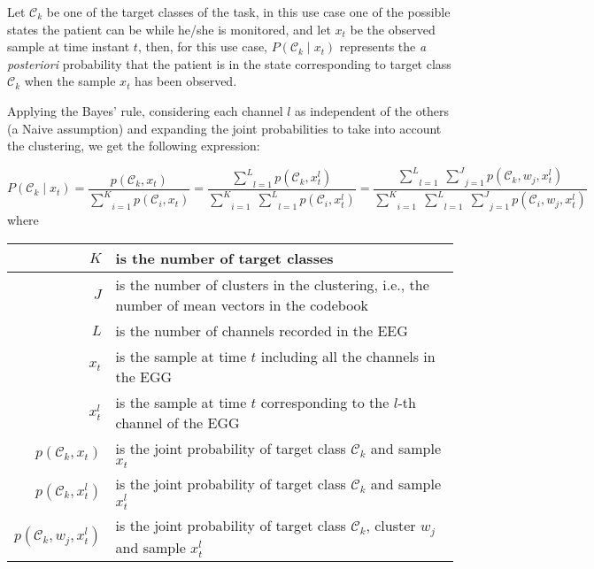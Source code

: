 \documentclass[a4paper,12pt]{article}
\begin{document}
\pagestyle{empty}

Let $\mathcal{C}_{k}$ be one of the target classes of the task, in this use case
one of the possible states the patient can be while he/she is monitored,
and let $x_{t}$ be the observed sample at time instant $t$,
then, for this use case, $P(\mathcal{C}_{k} \mid x_{t})$ represents the
\emph{a posteriori} probability that the patient is in the state corresponding
to target class $\mathcal{C}_{k}$ when the sample $x_{t}$ has been observed.

\bigskip

Applying the Bayes' rule, considering each channel $l$ as independent of the others (a Naive assumption)
and expanding the joint probabilities to take into account the clustering, we get the following 
expression:

\[
    P(\mathcal{C}_{k} \mid x_{t}) = 
    \frac{p(\mathcal{C}_{k}, x_{t})}{\underset{i=1}{\overset{K}{\sum}} p(\mathcal{C}_{i}, x_{t})} =
    \frac{\underset{l=1}{\overset{L}{\sum}} p(\mathcal{C}_{k}, x_{t}^{l})}{\underset{i=1}{\overset{K}{\sum}} \; \underset{l=1}{\overset{L}{\sum}} p(\mathcal{C}_{i}, x_{t}^{l})} =
    \frac{\underset{l=1}{\overset{L}{\sum}} \; \underset{j=1}{\overset{J}{\sum}} p(\mathcal{C}_{k}, w_{j}, x_{t}^{l})}{\underset{i=1}{\overset{K}{\sum}} \; \underset{l=1}{\overset{L}{\sum}} \; \underset{j=1}{\overset{J}{\sum}} p(\mathcal{C}_{i}, w_{j}, x_{t}^{l})}
\]
where
\begin{center}
\begin{tabular}{|r|p{100mm}|}
\hline
$K$ & is the number of target classes \\
\hline
$J$ & is the number of clusters in the clustering, i.e., the number of mean vectors in the codebook \\
\hline
$L$ & is the number of channels recorded in the EEG \\
\hline
$x_{t}$ & is the sample at time $t$ including all the channels in the EGG \\
\hline
$x_{t}^{l}$ & is the sample at time $t$ corresponding to the $l$-th channel of the EGG \\
\hline
$p(\mathcal{C}_{k}, x_{t})$ & is the joint probability of target class $\mathcal{C}_{k}$ and sample $x_{t}$ \\
\hline
$p(\mathcal{C}_{k}, x_{t}^{l})$ & is the joint probability of target class $\mathcal{C}_{k}$ and sample $x_{t}^{l}$ \\
\hline
$p(\mathcal{C}_{k}, w_{j}, x_{t}^{l})$ & is the joint probability of target class $\mathcal{C}_{k}$, cluster $w_{j}$ and sample $x_{t}^{l}$ \\
\hline
\end{tabular}
\end{center}
\end{document}

